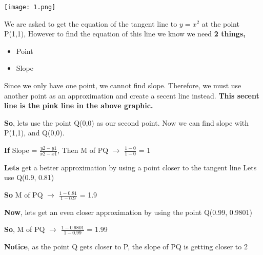 \documentclass{report}
\begin{document}
    \bigbreak \noindent 
    \begin{center}
        \texttt{[image: 1.png]}    
    \end{center}
    

    We are asked to get the equation of the tangent line to $y=x^2$ at the point P(1,1), 
    However to find the equation of this line we know we need \textbf{2 things,} 
    \begin{itemize}
        \item Point
        \item Slope
    \end{itemize}

    \noindent Since we only have one point, we cannot find slope. Therefore, we must use 
    another point as an approximation and create a secent line instead. \textbf{This secent line is 
    the pink line in the above graphic.}
    
    \bigbreak \noindent 
    \textbf{So}, lets use the point Q(0,0) as our second point. Now we can find slope with 
    P(1,1), and Q(0,0).

    \bigbreak \noindent 
    \begin{large}
        \textbf{If} Slope = $\frac{y2-y1}{x2-x1}$, Then M of PQ $\rightarrow$ $ \frac{1-0}{1-0}$ = 1
    \end{large}

    \bigbreak \noindent 
    \textbf{Lets} get a better approximation by using a point closer to the tangent line
    Lets use Q(0.9, 0.81)

    \bigbreak \noindent 
    \begin{large}
        \textbf{So} M of PQ $\rightarrow$ $\frac{1-0.81}{1-0.9}$ = 1.9
    \end{large}

    \bigbreak \noindent 
    \textbf{Now}, lets get an even closer approximation by using the point Q(0.99, 0.9801)
    
    \bigbreak \noindent 
    \begin{large}
       \textbf{So}, M of  PQ $\rightarrow$ $ \frac{1-0.9801}{1-0.99}$ = 1.99
    \end{large}

    \pagebreak
    \noindent \textbf{Notice}, as the point Q gets closer to P, the slope of PQ is getting closer to 2
    
\end{document}
